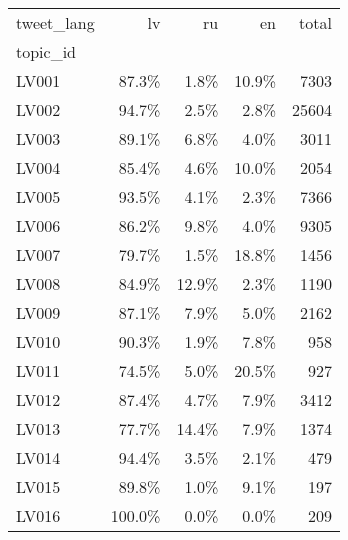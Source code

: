 \begin{tabular}{lrrrr}
\toprule
tweet\_lang &     lv &    ru &    en &  total \\
topic\_id &        &       &       &        \\
\midrule
LV001    &  87.3\% &  1.8\% & 10.9\% &   7303 \\
LV002    &  94.7\% &  2.5\% &  2.8\% &  25604 \\
LV003    &  89.1\% &  6.8\% &  4.0\% &   3011 \\
LV004    &  85.4\% &  4.6\% & 10.0\% &   2054 \\
LV005    &  93.5\% &  4.1\% &  2.3\% &   7366 \\
LV006    &  86.2\% &  9.8\% &  4.0\% &   9305 \\
LV007    &  79.7\% &  1.5\% & 18.8\% &   1456 \\
LV008    &  84.9\% & 12.9\% &  2.3\% &   1190 \\
LV009    &  87.1\% &  7.9\% &  5.0\% &   2162 \\
LV010    &  90.3\% &  1.9\% &  7.8\% &    958 \\
LV011    &  74.5\% &  5.0\% & 20.5\% &    927 \\
LV012    &  87.4\% &  4.7\% &  7.9\% &   3412 \\
LV013    &  77.7\% & 14.4\% &  7.9\% &   1374 \\
LV014    &  94.4\% &  3.5\% &  2.1\% &    479 \\
LV015    &  89.8\% &  1.0\% &  9.1\% &    197 \\
LV016    & 100.0\% &  0.0\% &  0.0\% &    209 \\
\bottomrule
\end{tabular}
